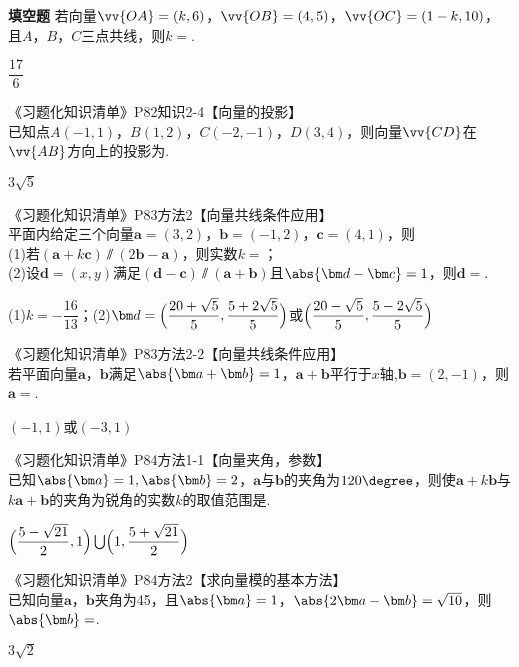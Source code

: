 \begin{exercise}{\bf 填空题}
      若向量$\vv{OA}=(k,6)$，$\vv{OB}=(4,5)$，$\vv{OC}=(1-k,10)$，且$A$，$B$，$C$三点共线，则$k=$\tk.
      \begin{answer}
        $\dfrac{17}6$
      \end{answer}
    \item 《习题化知识清单》P82知识2-4【向量的投影】\\
      已知点$A(-1,1)$，$B(1,2)$，$C(-2,-1)$，$D(3,4)$，则向量$\vv{CD}$在$\vv{AB}$方向上的投影为\tk.
      \begin{answer}
        $3\sqrt{5}$
      \end{answer}
    \item 《习题化知识清单》P83方法2【向量共线条件应用】\\
      平面内给定三个向量$\bm a=(3,2)$，$\bm b=(-1,2)$，$\bm c=(4,1)$，则\\
      (1)若$(\bm a+k\bm c)\varparallel(2\bm b-\bm a)$，则实数$k=$\tk；\\
      (2)设$\bm d=(x,y)$满足$(\bm d-\bm c) \varparallel (\bm a+\bm b)$且$\abs{\bm d-\bm c}=1$，则$\bm d=$\tk.
      \begin{answer}
        (1)$k=-\dfrac{16}{13}$；(2)$\bm d=\Bigl(\dfrac{20+\sqrt{5}}5,\dfrac{5+2\sqrt{5}}5\Bigr)$或$\Bigl(\dfrac{20-\sqrt{5}}5,\dfrac{5-2\sqrt{5}}5\Bigr)$
      \end{answer}
    \item 《习题化知识清单》P83方法2-2【向量共线条件应用】\\
      若平面向量$\bm a$，$\bm b$满足$\abs{\bm a+\bm b}=1$，$\bm a+\bm b$平行于$x$轴,$\bm b=(2,-1)$，则$\bm a=$\tk.
      \begin{answer}
        $(-1,1)$或$(-3,1)$
      \end{answer}
    \item 《习题化知识清单》P84方法1-1【向量夹角，参数】\\
       已知$\abs{\bm a}=1,\abs{\bm b}=2$，$\bm a$与$\bm b$的夹角为$120\degree$，则使$\bm a+k\bm b$与$k\bm a+\bm b$的夹角为锐角的实数$k$的取值范围是\tk[5].
      \begin{answer}
        $\Bigl(\dfrac{5-\sqrt{21}}2,1\Bigr)\bigcup\Bigl(1,\dfrac{5+\sqrt{21}}2\Bigr)$
      \end{answer}
    \item 《习题化知识清单》P84方法2【求向量模的基本方法】\\
      已知向量$\bm a$，$\bm b$夹角为45\degree，且$\abs{\bm a}=1$，$\abs{2\bm a-\bm b}=\sqrt{10}$，则$\abs{\bm b}=$\tk.
      \begin{answer}
        $3\sqrt{2}$

\end{answer}
\end{exercise}
